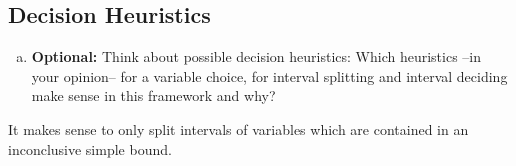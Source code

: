 
\subsection{Decision Heuristics}

\begin{enumerate}[(e)]
    \item \textbf{Optional:} Think about possible decision heuristics: Which heuristics –in your opinion– for a variable choice, for interval splitting and interval deciding make sense in this framework and why?
\end{enumerate}

It makes sense to only split intervals of variables which are contained in an inconclusive simple bound.
